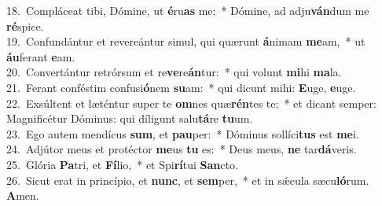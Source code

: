 {18.~}Compláceat tibi, Dómine, ut \textbf{é}ru\textbf{as} me:~* Dómine, ad adju\textbf{ván}dum me \textbf{ré}spice.\\
{19.~}Confundántur et revereántur simul, qui quærunt \textbf{á}nimam \textbf{me}am,~* ut \textbf{áu}ferant \textbf{e}am.\\
{20.~}Convertántur retrórsum et re\textbf{ve}re\textbf{án}tur:~* qui volunt \textbf{mi}hi \textbf{ma}la.\\
{21.~}Ferant conféstim confusi\textbf{ó}nem \textbf{su}am:~* qui dicunt mihi: \textbf{E}uge, \textbf{e}uge.\\
{22.~}Exsúltent et læténtur super te \textbf{om}nes quæ\textbf{rén}tes te:~* et dicant semper: Magnificétur Dóminus: qui díligunt salu\textbf{tá}re \textbf{tu}um.\\
{23.~}Ego autem mendícus \textbf{sum}, et \textbf{pau}per:~* Dóminus sollíci\textbf{tus} est \textbf{me}i.\\
{24.~}Adjútor meus et protéctor \textbf{me}us \textbf{tu} es:~* Deus meus, \textbf{ne} tar\textbf{dá}veris.\\
{25.~}Glória \textbf{Pa}tri, et \textbf{Fí}lio,~* et Spi\textbf{rí}tui \textbf{San}cto.\\
{26.~}Sicut erat in princípio, et \textbf{nunc}, et \textbf{sem}per,~* et in sǽcula sæcu\textbf{ló}rum. \textbf{A}men.\\
